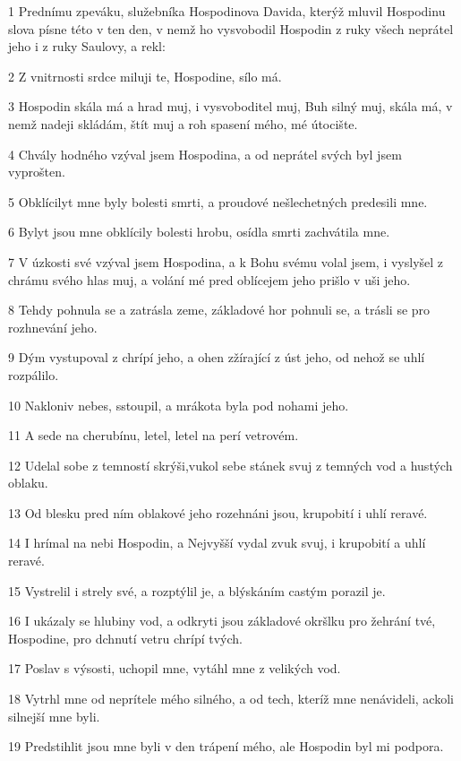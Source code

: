 \par 1 Prednímu zpeváku, služebníka Hospodinova Davida, kterýž mluvil Hospodinu slova písne této v ten den, v nemž ho vysvobodil Hospodin z ruky všech neprátel jeho i z ruky Saulovy, a rekl:
\par 2 Z vnitrnosti srdce miluji te, Hospodine, sílo má.
\par 3 Hospodin skála má a hrad muj, i vysvoboditel muj, Buh silný muj, skála má, v nemž nadeji skládám, štít muj a roh spasení mého, mé útocište.
\par 4 Chvály hodného vzýval jsem Hospodina, a od neprátel svých byl jsem vyprošten.
\par 5 Obklícilyt mne byly bolesti smrti, a proudové nešlechetných predesili mne.
\par 6 Bylyt jsou mne obklícily bolesti hrobu, osídla smrti zachvátila mne.
\par 7 V úzkosti své vzýval jsem Hospodina, a k Bohu svému volal jsem, i vyslyšel z chrámu svého hlas muj, a volání mé pred oblícejem jeho prišlo v uši jeho.
\par 8 Tehdy pohnula se a zatrásla zeme, základové hor pohnuli se, a trásli se pro rozhnevání jeho.
\par 9 Dým vystupoval z chrípí jeho, a ohen zžírající z úst jeho, od nehož se uhlí rozpálilo.
\par 10 Nakloniv nebes, sstoupil, a mrákota byla pod nohami jeho.
\par 11 A sede na cherubínu, letel, letel na perí vetrovém.
\par 12 Udelal sobe z temností skrýši,vukol sebe stánek svuj z temných vod a hustých oblaku.
\par 13 Od blesku pred ním oblakové jeho rozehnáni jsou, krupobití i uhlí reravé.
\par 14 I hrímal na nebi Hospodin, a Nejvyšší vydal zvuk svuj, i krupobití a uhlí reravé.
\par 15 Vystrelil i strely své, a rozptýlil je, a blýskáním castým porazil je.
\par 16 I ukázaly se hlubiny vod, a odkryti jsou základové okršlku pro žehrání tvé, Hospodine, pro dchnutí vetru chrípí tvých.
\par 17 Poslav s výsosti, uchopil mne, vytáhl mne z velikých vod.
\par 18 Vytrhl mne od neprítele mého silného, a od tech, kteríž mne nenávideli, ackoli silnejší mne byli.
\par 19 Predstihlit jsou mne byli v den trápení mého, ale Hospodin byl mi podpora.
